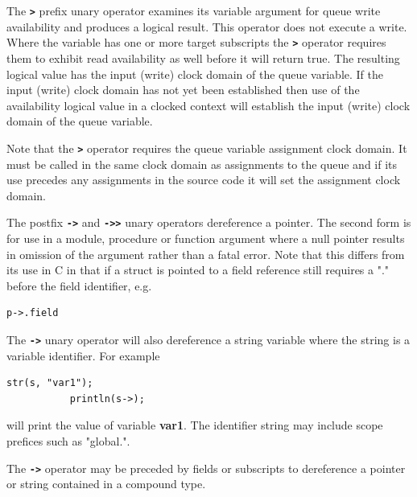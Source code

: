         The {\bf \verb'>'} prefix unary operator examines its variable argument for
        queue write availability and produces a logical result. This operator does
        not execute a write. Where the variable has one or more target subscripts
        the {\bf \verb'>'} operator requires them to exhibit read availability as
        well before it will return true. The resulting logical value has the input
        (write) clock domain of the queue variable. If
        the input (write) clock domain has not yet been established then use of the
        availability logical value in a clocked context will establish the input
        (write) clock domain of the queue variable.

        Note that the {\bf \verb'>'} operator requires the queue variable
        assignment clock domain. It must be called in the same clock domain as
        assignments to the queue and if its use precedes any assignments in the
        source code it will set the assignment clock domain.

        The postfix {\bf \verb'->'} and {\bf \verb'->>'} unary operators
        dereference a pointer. The second form is for use in a module, procedure
        or function argument where a null pointer results in omission of the
        argument rather than a fatal error. Note that this differs from its use in
        C in that if a struct is pointed to a field reference still requires a "."
        before the field identifier, e.g.
        \begin{lstlisting}[gobble=8, language=threepl]
           p->.field
        \end{lstlisting}

        The {\bf \verb'->'} unary operator will also dereference a string variable
        where the string is a variable identifier. For example
        \begin{lstlisting}[gobble=8, language=threepl]
           str(s, "var1");
           println(s->);
        \end{lstlisting}
        will print the value of variable {\bf var1}. The identifier string
        may include scope prefices such as "global.".
        
        The {\bf \verb'->'} operator may be preceded by fields or subscripts
        to dereference a pointer or string contained in a compound type.

